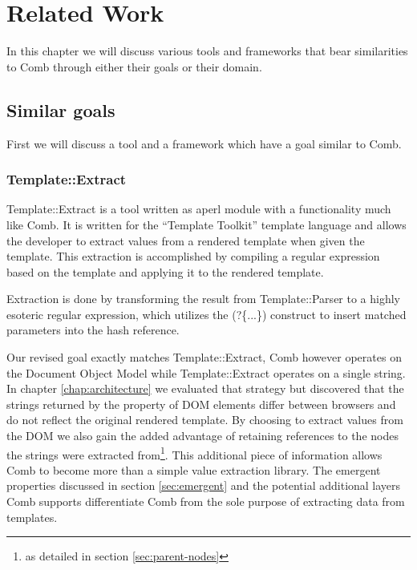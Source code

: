 \documentclass[thesis.tex]{subfiles}
\begin{document}
\chapter{Related Work}
\label{chap:related}
In this chapter we will discuss various tools and frameworks that bear
similarities to Comb through either their goals or their domain.


\section{Similar goals}
First we will discuss a tool and a framework which have a goal similar to Comb.

\subsection{Template::Extract}
Template::Extract\cite{TPLEXTRACT} is a tool written as aperl module with a
functionality much like Comb. It is written for the ``Template Toolkit''
template language and allows the developer to extract values from a rendered
template when given the template.
This extraction is accomplished by compiling a regular expression based on the
template and applying it to the rendered template.

\begin{citequote}{\cite{TPLEXTRACT}}
Extraction is done by transforming the result from Template::Parser to a highly
esoteric regular expression, which utilizes the (?\{...\}) construct to insert
matched parameters into the hash reference.
\end{citequote}

Our revised goal exactly matches Template::Extract, Comb however operates on the
Document Object Model while Template::Extract operates on a single string.
In chapter \ref{chap:architecture} we evaluated that strategy but discovered
that the strings returned by the  property of DOM elements
differ between browsers and do not reflect the original rendered template.
By choosing to extract values from the DOM we also gain the added advantage
of retaining references to the nodes the strings were extracted
from\footnote{as detailed in section \ref{sec:parent-nodes}}.
This additional piece of information allows Comb to become more than a simple
value extraction library. The emergent properties discussed in
section \ref{sec:emergent} and the potential additional layers Comb supports
differentiate Comb from the sole purpose of extracting data from templates.
\end{document}
